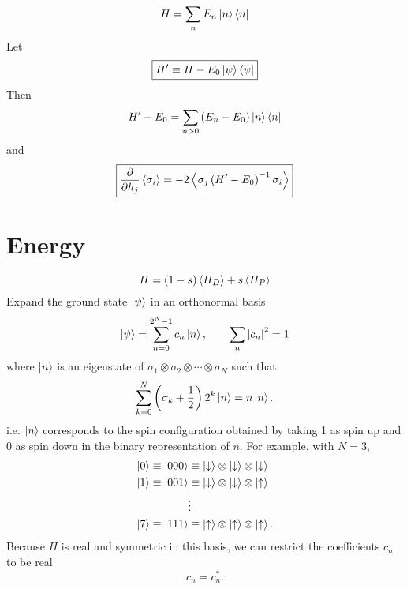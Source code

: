 \begin{equation}
  H = \sum_n E_n \left| n \right> \left< n \right|
  \label{}
\end{equation}
Let
\begin{equation}
  \boxed{
  H^{\prime} \equiv H - E_0 \left| \psi \right> \left< \psi \right|
  }
  \label{}
\end{equation}
Then
\begin{equation}
  H^{\prime} - E_0 = \sum_{n>0} \left( E_n - E_0 \right) \left| n \right> \left< n \right|
  \label{}
\end{equation}
and
\begin{equation}
  \boxed{
  \frac{\partial }{\partial h_j} \left< \sigma_i \right>
  = -2 \left< \sigma_j \left( H^{\prime} - E_0 \right)^{-1} \sigma_i \right>
  }
  \label{}
\end{equation}

\section*{Energy}
\begin{equation}
  H = (1 - s) \left< H_D \right> + s \left< H_P \right>
  \label{}
\end{equation}
Expand the ground state $\left| \psi \right>$ in an orthonormal basis
\begin{equation}
  \left| \psi \right> = \sum_{n=0}^{2^N-1} c_n \left| n \right>,
  \qquad
  \sum_n \left| c_n \right|^2 = 1
  \label{}
\end{equation}
where $\left| n \right>$ is an eigenstate of
$\sigma_1 \otimes \sigma_2 \otimes \cdots \otimes \sigma_N$
such that
\begin{equation}
    \sum_{k=0}^N \left( \sigma_k + \frac{1}{2} \right) 2^k \left| n \right> = n \left| n \right>.
  \label{}
\end{equation}
i.e. $\left| n \right>$ corresponds to the spin configuration obtained by taking 1
as spin up and 0 as spin down in the binary representation of $n$.
For example, with $N=3$,
\begin{align*}
  \left| 0 \right> \equiv \left| 000 \right>
  &\equiv
  \left| \downarrow \right> \otimes
  \left| \downarrow \right> \otimes
  \left| \downarrow \right> \\
  \left| 1 \right> \equiv \left| 001 \right>
  &\equiv
  \left| \downarrow \right> \otimes
  \left| \downarrow \right> \otimes
  \left| \uparrow \right> \\
  &\vdots \\
  \left| 7 \right> \equiv \left| 111 \right>
  &\equiv
  \left| \uparrow \right> \otimes
  \left| \uparrow \right> \otimes
  \left| \uparrow \right>.
  \label{}
\end{align*}
Because $H$ is real and symmetric in this basis, we can restrict the
coefficients $c_n$ to be real
\begin{equation}
  c_n = c_n^*.
  \label{}
\end{equation}
